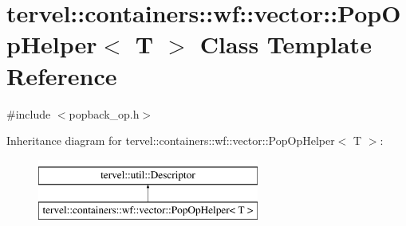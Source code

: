\hypertarget{classtervel_1_1containers_1_1wf_1_1vector_1_1_pop_op_helper}{}\section{tervel\+:\+:containers\+:\+:wf\+:\+:vector\+:\+:Pop\+Op\+Helper$<$ T $>$ Class Template Reference}
\label{classtervel_1_1containers_1_1wf_1_1vector_1_1_pop_op_helper}


{\ttfamily \#include $<$popback\+\_\+op.\+h$>$}

Inheritance diagram for tervel\+:\+:containers\+:\+:wf\+:\+:vector\+:\+:Pop\+Op\+Helper$<$ T $>$\+:\begin{figure}[H]
\begin{center}
\leavevmode
\includegraphics[height=2.000000cm]{classtervel_1_1containers_1_1wf_1_1vector_1_1_pop_op_helper}
\end{center}
\end{figure}
